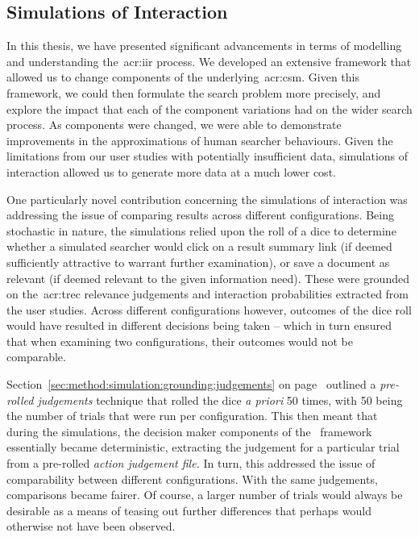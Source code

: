 \subsection{Simulations of Interaction}\label{sec:conclusions:discussion:simulations}
In this thesis, we have presented significant advancements in terms of modelling and understanding the~\gls{acr:iir} process. We developed an extensive framework that allowed us to change components of the underlying~\gls{acr:csm}. Given this framework, we could then formulate the search problem more precisely, and explore the impact that each of the component variations had on the wider search process. As components were changed, we were able to demonstrate improvements in the approximations of human searcher behaviours. Given the limitations from our user studies with potentially insufficient data, simulations of interaction allowed us to generate more data at a much lower cost.

One particularly novel contribution concerning the simulations of interaction was addressing the issue of comparing results across different configurations. Being stochastic in nature, the simulations relied upon the roll of a dice to determine whether a simulated searcher would click on a result summary link (if deemed sufficiently attractive to warrant further examination), or save a document as relevant (if deemed relevant to the given information need). These were grounded on the~\gls{acr:trec} relevance judgements and interaction probabilities extracted from the user studies. Across different configurations however, outcomes of the dice roll would have resulted in different decisions being taken -- which in turn ensured that when examining two configurations, their outcomes would not be comparable.

Section~\ref{sec:method:simulation:grounding:judgements} on page~\pageref{sec:method:simulation:grounding:judgements} outlined a \emph{pre-rolled judgements} technique that rolled the dice \emph{a priori} 50 times, with 50 being the number of trials that were run per configuration. This then meant that during the simulations, the decision maker components of the \simiir~framework essentially became deterministic, extracting the judgement for a particular trial from a pre-rolled \emph{action judgement file.} In turn, this addressed the issue of comparability between different configurations. With the same judgements, comparisons became fairer. Of course, a larger number of trials would always be desirable as a means of teasing out further differences that perhaps would otherwise not have been observed.

